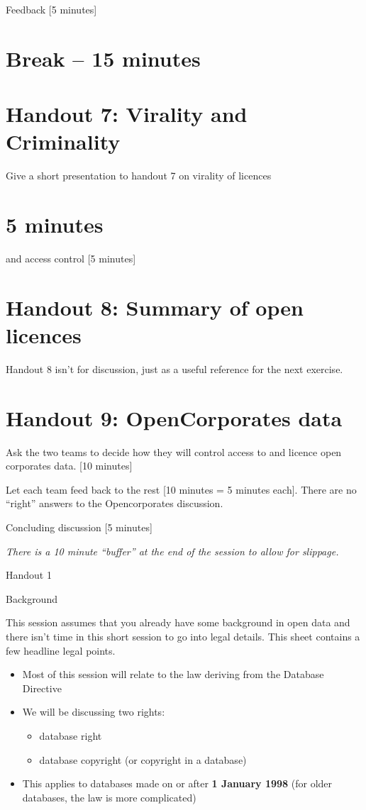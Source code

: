 \documentclass{article}
\begin{document}
Feedback {[}5 minutes{]}

\section{Break -- 15 minutes}

\section{Handout 7: Virality and Criminality}

Give a short presentation to handout 7 on virality of licences \section{5
minutes} and access control {[}5 minutes{]}

\section{Handout 8: Summary of open licences}

Handout 8 isn't for discussion, just as a useful reference for the next
exercise.

\section{Handout 9: OpenCorporates data}

Ask the two teams to decide how they will control access to and licence
open corporates data. {[}10 minutes{]}

Let each team feed back to the rest {[}10 minutes = 5 minutes each{]}.
There are no ``right'' answers to the Opencorporates discussion.

Concluding discussion {[}5 minutes{]}

\emph{There is a 10 minute ``buffer'' at the end of the session to allow
for slippage.}

Handout 1

Background

This session assumes that you already have some background in open data
and there isn't time in this short session to go into legal details.
This sheet contains a few headline legal points.

\begin{itemize}
\item
  Most of this session will relate to the law deriving from the Database
  Directive
\item
  We will be discussing two rights:

  \begin{itemize}
  \item
    database right
  \item
    database copyright (or copyright in a database)
  \end{itemize}
\item
  This applies to databases made on or after \textbf{1 January 1998}
  (for older databases, the law is more complicated)
\end{itemize}
\end{document}
